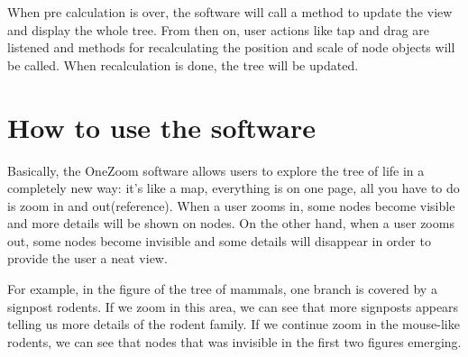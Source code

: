 \documentclass[MSc]{icldt}
\begin{document}
When pre calculation is over, the software will call a method to update the view and display the whole tree. From then on, user actions like tap and drag are listened and methods for recalculating the position and scale of node objects will be called. When recalculation is done, the tree will be updated. 



\section{How to use the software}
Basically, the OneZoom software allows users to explore the tree of life in a completely new way: it's like a map, everything is on one page, all you have to do is zoom in and out(reference). When a user zooms in, some nodes become visible and more details will be shown on nodes. On the other hand, when a user zooms out, some nodes become invisible and some details will disappear in order to provide the user a neat view. 

For example, in the figure of the tree of mammals, one branch is covered by a signpost rodents. If we zoom in this area, we can see that more signposts appears telling us more details of the rodent family. If we continue zoom in the mouse-like rodents, we can see that nodes that was invisible in the first two figures emerging.
\end{document}

